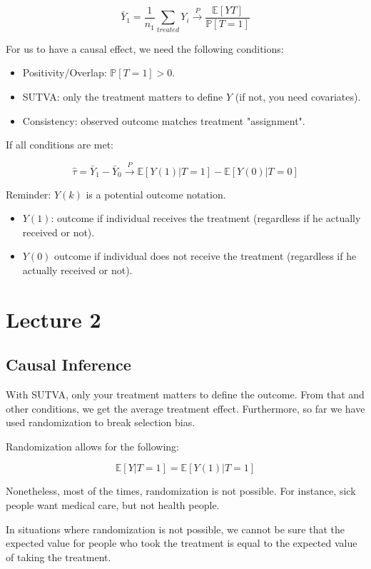 \documentclass{article}
\begin{document}
$$
\bar{Y}_1 = \frac{1}{n_1} \sum_{treated} Y_i \xrightarrow{P} \frac{\mathbb{E}[YT]}{\mathbb{P}[T = 1]}
$$

For us to have a causal effect, we need the following conditions:
\begin{itemize}
    \item Positivity/Overlap: $\mathbb{P}[T=1] >0$.
    \item SUTVA: only the treatment matters to define $Y$ (if not, you need covariates).
    \item Consistency: observed outcome matches treatment "assignment".
\end{itemize}

If all conditions are met:

$$
\hat{\tau} = \bar{Y}_1 - \bar{Y}_0 \xrightarrow{P} \mathbb{E}[Y(1) | T = 1] - \mathbb{E}[Y(0) | T = 0]
$$

Reminder: $Y(k)$ is a potential outcome notation.
\begin{itemize}
    \item $Y(1)$: outcome if individual receives the treatment (regardless if he actually received or not).
    \item $Y(0)$ outcome if individual does not receive the treatment (regardless if he actually received or not).
\end{itemize}

\section{Lecture 2}

\subsection{Causal Inference}

With SUTVA, only your treatment matters to define the outcome. From that and other conditions, we get the average treatment effect. Furthermore, so far we have used randomization to break selection bias.

Randomization allows for the following:

$$
\mathbb{E}[Y | T = 1] = \mathbb{E}[Y(1) | T = 1]
$$

Nonetheless, most of the times, randomization is not possible. For instance, sick people want medical care, but not health people.

In situations where randomization is not possible, we cannot be sure that the expected value for people who took the treatment is equal to the expected value of taking the treatment.
\end{document}
